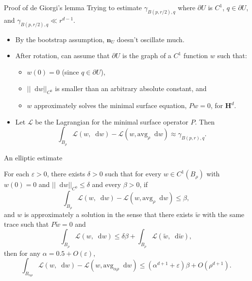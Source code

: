 \documentclass[10pt]{beamer}
\newcommand{\Hyp}{\mathbf H}
\newcommand*\dif{\mathop{}\!\mathrm{d}}
\newcommand{\avg}{\mathrm{avg}}
\newcommand{\normal}{\mathbf n}
\begin{document}
\begin{frame}{Proof of de Giorgi's lemma}
Trying to estimate $\gamma_{B(p, r/2), q}$ where $\partial U$ is $C^1$, $q \in \partial U$, and $\gamma_{B(p, r/2), q} \ll r^{d - 1}$.\pause

\begin{itemize}
\item By the bootstrap assumption, $\normal_U$ doesn't oscillate much.\pause
\item After rotation, can assume that $\partial U$ is the graph of a $C^1$ function $w$ such that:\pause
\begin{itemize}
\item $w(0) = 0$ (since $q \in \partial U$),\pause
\item $||\dif w||_{C^0}$ is smaller than an arbitrary absolute constant, and \pause
\item $w$ approximately solves the minimal surface equation, $Pw = 0$, for $\Hyp^d$.\pause
\end{itemize}
\item Let $\mathscr L$ be the Lagrangian for the minimal surface operator $P$. Then 
$$\int_{B_\rho} \mathscr L(w, \dif w) - \mathscr L(w, \avg_\rho \dif w) \approx \gamma_{B(p, r), q}.$$
\end{itemize}
\end{frame}

\begin{frame}{An elliptic estimate}
\begin{lemma}
For each $\varepsilon > 0$, there exists $\delta > 0$ such that for every $w \in C^1(B_\rho)$ with $w(0) = 0$ and $||\dif w||_{C^0} \leq \delta$ and every $\beta > 0$, if 
$$\int_{B_\rho} \mathscr L(w, \dif w) - \mathscr L(w, \avg_\rho \dif w) \leq \beta,$$
and $w$ is approximately a solution in the sense that there exists $\tilde w$ with the same trace such that $P\tilde w = 0$ and
$$\int_{B_\rho} \mathscr L(w, \dif w) \leq \delta \beta + \int_{B_\rho} \mathscr L(\tilde w, \dif \tilde w),$$
then for any $\alpha = 0.5 + O(\varepsilon)$,
$$\int_{B_{\alpha \rho}} \mathscr L(w, \dif w) - \mathscr L(w, \avg_{\alpha \rho} \dif w) \leq (\alpha^{d + 1} + \varepsilon) \beta + O(\rho^{d + 1}).$$
\end{lemma}
\end{frame}
\end{document}
